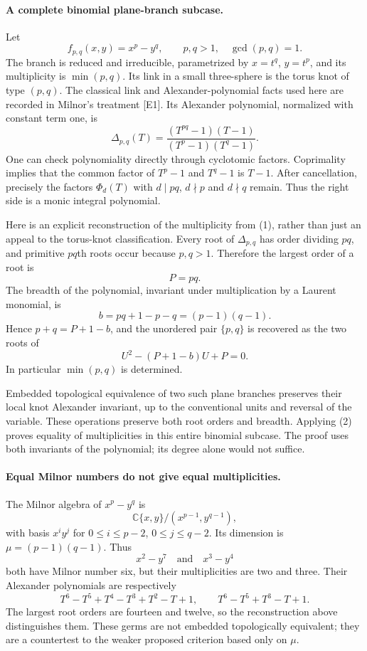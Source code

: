 \documentclass[11pt]{article}
\begin{document}
\paragraph{A complete binomial plane-branch subcase.}
Let
\[
 f_{p,q}(x,y)=x^p-y^q,\qquad p,q>1,\quad\gcd(p,q)=1.
\]
The branch is reduced and irreducible, parametrized by $x=t^q$, $y=t^p$, and its multiplicity is $\min(p,q)$. Its link in a small three-sphere is the torus knot of type $(p,q)$. The classical link and Alexander-polynomial facts used here are recorded in Milnor's treatment [E1]. Its Alexander polynomial, normalized with constant term one, is
\[
 \Delta_{p,q}(T)=
 \frac{(T^{pq}-1)(T-1)}{(T^p-1)(T^q-1)}.                 \tag{1}
\]
One can check polynomiality directly through cyclotomic factors. Coprimality implies that the common factor of $T^p-1$ and $T^q-1$ is $T-1$. After cancellation, precisely the factors $\Phi_d(T)$ with $d\mid pq$, $d\nmid p$ and $d\nmid q$ remain. Thus the right side is a monic integral polynomial.

Here is an explicit reconstruction of the multiplicity from (1), rather than just an appeal to the torus-knot classification. Every root of $\Delta_{p,q}$ has order dividing $pq$, and primitive $pq$th roots occur because $p,q>1$. Therefore the largest order of a root is
\[
 P=pq.
\]
The breadth of the polynomial, invariant under multiplication by a Laurent monomial, is
\[
 b=pq+1-p-q=(p-1)(q-1).
\]
Hence $p+q=P+1-b$, and the unordered pair $\{p,q\}$ is recovered as the two roots of
\[
 U^2-(P+1-b)U+P=0.                                       \tag{2}
\]
In particular $\min(p,q)$ is determined.

Embedded topological equivalence of two such plane branches preserves their local knot Alexander invariant, up to the conventional units and reversal of the variable. These operations preserve both root orders and breadth. Applying (2) proves equality of multiplicities in this entire binomial subcase. The proof uses both invariants of the polynomial; its degree alone would not suffice.

\paragraph{Equal Milnor numbers do not give equal multiplicities.}
The Milnor algebra of $x^p-y^q$ is
\[
 \mathbb C\{x,y\}/(x^{p-1},y^{q-1}),
\]
with basis $x^iy^j$ for $0\le i\le p-2$, $0\le j\le q-2$. Its dimension is $\mu=(p-1)(q-1)$. Thus
\[
 x^2-y^7\quad\text{and}\quad x^3-y^4
\]
both have Milnor number six, but their multiplicities are two and three. Their Alexander polynomials are respectively
\[
 T^6-T^5+T^4-T^3+T^2-T+1,
 \qquad T^6-T^5+T^3-T+1.                                  \tag{3}
\]
The largest root orders are fourteen and twelve, so the reconstruction above distinguishes them. These germs are not embedded topologically equivalent; they are a countertest to the weaker proposed criterion based only on $\mu$.
\end{document}
